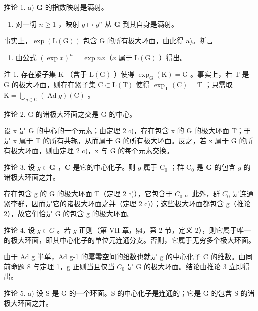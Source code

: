 推论 1. a) \(\mathbf{G}\) 的指数映射是满射。

\begin{enumerate}
\def\labelenumi{\alph{enumi})}
\setcounter{enumi}{1}
\tightlist
\item
  对一切 \(n \geq 1\) ，映射 \(g \mapsto g^n\) 从 \(\mathbf{G}\) 到其自身是满射。
\end{enumerate}

事实上，\(\exp(\mathrm{L}(\mathrm{G}))\) 包含 G 的所有极大环面，由此得 a)。断言

\begin{enumerate}
\def\labelenumi{\alph{enumi})}
\setcounter{enumi}{1}
\tightlist
\item
  由公式 \((\exp x)^n = \exp nx\)（\(x\) 属于 \(\mathrm{L}(\mathrm{G})\) ）得出。
\end{enumerate}

注 1. 存在紧子集 \(\mathrm{K}\) （含于 \(\mathrm{L}(\mathrm{G})\) ）使得 \(\exp_{\mathrm{G}}(\mathrm{K}) = \mathrm{G}\) 。事实上，若 \(\mathrm{T}\) 是 \(\mathrm{G}\) 的极大环面，则存在紧子集 \(\mathrm{C} \subset \mathrm{L}(\mathrm{T})\) 使得 \(\exp_{\mathrm{T}}(\mathrm{C}) = \mathrm{T}\) ；只需取 \(\mathrm{K} = \bigcup_{g \in \mathrm{G}} (\operatorname{Ad} g)(\mathrm{C})\) 。

推论 2. G 的诸极大环面之交是 G 的中心。

设 x 是 G 的中心的一个元素；由定理 2 c)，存在包含 x 的 G 的极大环面 T；于是 x 属于 T 的所有共轭，从而属于 G 的所有极大环面。反之，若 x 属于 G 的所有极大环面，则由定理 2 c)，x 与 G 的每个元素交换。

推论 3. 设 \(g \in \mathbf{G}\) ，\(\mathbf{C}\) 是它的中心化子。则 \(g\) 属于 \(\mathrm{C}_0\) ；群 \(\mathrm{C}_0\) 是 \(\mathbf{G}\) 的包含 \(g\) 的诸极大环面之并。

存在包含 g 的 G 的极大环面 T（定理 2 c)），它包含于 \(C_{0}\) 。此外，群 \(C_{0}\) 是连通紧李群，因而是它的诸极大环面之并（定理 2 c)）；这些极大环面都包含 g（推论 2），故它们恰是 G 的包含 g 的极大环面。

推论 4. 设 \(g \in G\) 。若 \(g\) 正则（第 VII 章，§4，第 2 节，定义 2），则它属于唯一的极大环面，即其中心化子的单位元连通分支。否则，它属于无穷多个极大环面。

由于 Ad g 半单，Ad g-1 的幂零空间的维数也就是 g 的中心化子 C 的维数。由同前命题 8 与定理 1，g 正则当且仅当 \(C_{0}\) 是 G 的极大环面。结论由推论 3 立即得出。

推论 5. a) 设 S 是 G 的一个环面。S 的中心化子是连通的；它是 G 的包含 S 的诸极大环面之并。

